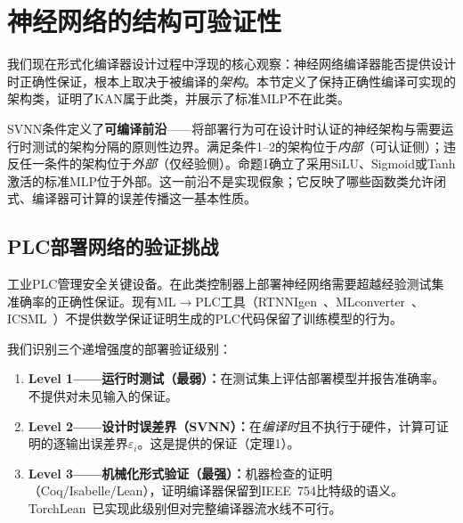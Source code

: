 \section{神经网络的结构可验证性}
\label{sec:svnn}

我们现在形式化编译器设计过程中浮现的核心观察：神经网络编译器能否提供设计时正确性保证，根本上取决于被编译的\textit{架构}。本节定义了保持正确性编译可实现的架构类，证明了KAN属于此类，并展示了标准MLP不在此类。

\vspace{4pt}
\begin{remark}[可编译前沿]
\label{rem:compilable_frontier}
SVNN条件定义了\textbf{可编译前沿}——将部署行为可在设计时认证的神经架构与需要运行时测试的架构分隔的原则性边界。满足条件1--2的架构位于\textit{内部}（可认证侧）；违反任一条件的架构位于\textit{外部}（仅经验侧）。命题1确立了采用SiLU、Sigmoid或Tanh激活的标准MLP位于外部。这一前沿不是实现假象；它反映了哪些函数类允许闭式、编译器可计算的误差传播这一基本性质。
\end{remark}

\subsection{PLC部署网络的验证挑战}
\label{sec:svnn-challenge}

工业PLC管理安全关键设备。在此类控制器上部署神经网络需要超越经验测试集准确率的正确性保证。现有ML$\to$PLC工具（RTNNIgen~\cite{rtnnigen2024}、MLconverter~\cite{mlconverter2025}、ICSML~\cite{icsml2023}）不提供数学保证证明生成的PLC代码保留了训练模型的行为。

我们识别三个递增强度的部署验证级别：
\begin{enumerate}
    \item \textbf{Level 1——运行时测试（最弱）：}在测试集上评估部署模型并报告准确率。不提供对未见输入的保证。
    \item \textbf{Level 2——设计时误差界（SVNN）：}在\textit{编译时}且不执行于硬件，计算可证明的逐输出误差界$\varepsilon_i$。这是\neuroplc{}提供的保证（定理1）。
    \item \textbf{Level 3——机械化形式验证（最强）：}机器检查的证明（Coq/Isabelle/Lean），证明编译器保留到IEEE~754比特级的语义。TorchLean~\cite{torchlean2025}已实现此级别但对完整编译器流水线不可行。
\end{enumerate}

